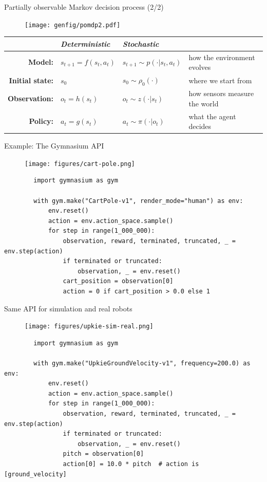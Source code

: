 \documentclass[10pt, aspectratio=1610]{beamer}
\begin{document}
\begin{frame}{Partially observable Markov decision process (2/2)}
    \begin{figure}
        \texttt{[image: genfig/pomdp2.pdf]}
    \end{figure}
    \begin{table}
        \begin{tabular}{rlll}
            & \emph{Deterministic} & \emph{Stochastic} \\
            \hline
            \textbf{Model:} & $s_{t+1} = f(s_t, a_t)$ & $s_{t+1} \sim p(\cdot | s_t, a_t)$ & how the environment evolves \\
            \textbf{Initial state:} & $s_0$ & $s_0 \sim \rho_0(\cdot)$ & where we start from \\
            \textbf{Observation:} & $o_t = h(s_t)$ & $o_t \sim z(\cdot | s_t)$ & how sensors measure the world \\  %
            \textbf{Policy:} & $a_t = g(s_t)$ & $a_t \sim \pi(\cdot | o_t)$ & what the agent decides
        \end{tabular}
    \end{table}
\end{frame}

\begin{frame}[fragile]{Example: The Gymnasium API}
    \begin{figure}
        \texttt{[image: figures/cart-pole.png]}
    \end{figure}
    \begin{verbatim}
        import gymnasium as gym

        with gym.make("CartPole-v1", render_mode="human") as env:
            env.reset()
            action = env.action_space.sample()
            for step in range(1_000_000):
                observation, reward, terminated, truncated, _ = env.step(action)
                if terminated or truncated:
                    observation, _ = env.reset()
                cart_position = observation[0]
                action = 0 if cart_position > 0.0 else 1
    \end{verbatim}
\end{frame}

\begin{frame}[fragile]{Same API for simulation and real robots}
    \begin{figure}
        \texttt{[image: figures/upkie-sim-real.png]}
    \end{figure}
    \begin{verbatim}
        import gymnasium as gym

        with gym.make("UpkieGroundVelocity-v1", frequency=200.0) as env:
            env.reset()
            action = env.action_space.sample()
            for step in range(1_000_000):
                observation, reward, terminated, truncated, _ = env.step(action)
                if terminated or truncated:
                    observation, _ = env.reset()
                pitch = observation[0]
                action[0] = 10.0 * pitch  # action is [ground_velocity]
    \end{verbatim}
\end{frame}
\end{document}
